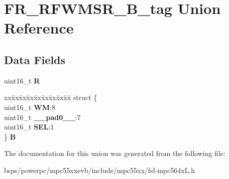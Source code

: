 \hypertarget{unionFR__RFWMSR__16B__tag}{}\section{F\+R\+\_\+\+R\+F\+W\+M\+S\+R\+\_\+B\+\_\+tag Union Reference}
\label{unionFR__RFWMSR__16B__tag}
\subsection*{Data Fields}
\begin{DoxyCompactItemize}
\item 
\mbox{\label{unionFR__RFWMSR__16B__tag_aa87789c2940e89ec87fa5278dec0ec28}} 
uint16\+\_\+t {\bfseries R}
\item 
\mbox{\label{unionFR__RFWMSR__16B__tag_ab83b0df17f8ee759ec9f33228e8bf138}} 
\begin{tabbing}
xx\=xx\=xx\=xx\=xx\=xx\=xx\=xx\=xx\=\kill
struct \{\\
\>uint16\_t {\bfseries WM}:8\\
\>uint16\_t {\bfseries \_\_pad0\_\_}:7\\
\>uint16\_t {\bfseries SEL}:1\\
\} {\bfseries B}\\

\end{tabbing}\end{DoxyCompactItemize}


The documentation for this union was generated from the following file\+:\begin{DoxyCompactItemize}
\item 
bsps/powerpc/mpc55xxevb/include/mpc55xx/fsl-\/mpc564x\+L.\+h\end{DoxyCompactItemize}
